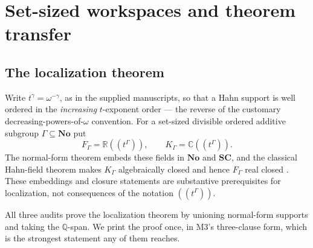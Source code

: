 \documentclass[11pt,letterpaper]{article}
\numberwithin{equation}{section}
\theoremstyle{definition}
\theoremstyle{remark}
\newcommand{\No}{\mathbf{No}}
\newcommand{\SC}{\mathbf{SC}}
\newcommand{\R}{\mathbb R}
\newcommand{\C}{\mathbb C}
\newcommand{\Q}{\mathbb Q}
\begin{document}
\section{Set-sized workspaces and theorem transfer}
\label{found:sec:workspaces}

\subsection{The localization theorem}
\label{found:sub:localization}
Write $t^\gamma=\omega^{-\gamma}$, as in the supplied manuscripts, so that a
Hahn support is well ordered in the \emph{increasing} $t$-exponent order --- the
reverse of the customary decreasing-powers-of-$\omega$ convention. For a
set-sized divisible ordered additive subgroup $\Gamma\subseteq\No$ put
\[
 F_\Gamma=\R((t^\Gamma)),\qquad K_\Gamma=\C((t^\Gamma)).
\]
The normal-form theorem embeds these fields in $\No$ and $\SC$, and the
classical Hahn-field theorem makes $K_\Gamma$ algebraically closed and hence
$F_\Gamma$ real closed
\cite{found:Conway,found:Gonshor,found:Poonen}. These embeddings and closure
statements are substantive prerequisites for localization, not consequences of
the notation $((t^\Gamma))$.

All three audits prove the localization theorem by unioning normal-form supports
and taking the $\Q$-span. We print the proof once, in M3's three-clause form,
which is the strongest statement any of them reaches.
\end{document}
